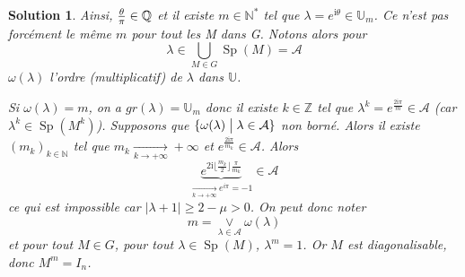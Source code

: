 \documentclass[12pt]{article}
\newtheorem{solution}{Solution}[section]
\theoremstyle{remark}
\newcommand{\N}{\mathbb{N}} \newcommand{\Z}{\mathbb{Z}}
\newcommand{\U}{\mathbb{U}} \newcommand{\E}{\mathbb{E}}
\DeclareMathOperator{\Sp}{Sp} \DeclareMathOperator{\mat}{mat}
\numberwithin{equation}{section}
\begin{document}
\begin{solution}
	Ainsi, $\frac{\theta}{\pi}\in\mathbb{Q}$ et il existe $m\in\N^{*}$ tel que $\lambda=e^{\mathrm{i}\theta}\in\U_{m}$. Ce n'est pas forcément le même $m$ pour tout les M dans G. Notons alors pour 
	$$\lambda\in\bigcup_{M\in G}\Sp(M)=\mathcal{A}$$
	$\omega(\lambda)$ l'ordre (multiplicatif) de $\lambda$ dans $\U$.

	Si $\omega(\lambda)=m$, on a $gr(\lambda)=\U_{m}$ donc il existe $k\in\Z$ tel que $\lambda^{k}=e^{\frac{2\mathrm{i}\pi}{m}}\in\mathcal{A}$ (car $\lambda^{k}\in\Sp(M^{k})$). Supposons que $\{\omega(\lambda)\bigm| \lambda\in\mathcal{A}\}$ non borné. Alors il existe $(m_{k})_{k\in\N}$ tel que $m_{k}\xrightarrow[k\to+\infty]{}+\infty$ et $e^{\frac{2\mathrm{i}\pi}{m_{k}}}\in\mathcal{A}$. Alors 
	$$\underbrace{e^{2\mathrm{i}\lfloor\frac{m_{k}}{2}\rfloor \frac{\pi}{m_{k}}}}_{\xrightarrow[k\to+\infty]{} e^{i\pi}=-1}\in\mathcal{A}$$
	ce qui est impossible car $\vert\lambda+1\vert\geqslant2-\mu>0$. On peut donc noter
	$$m=\underset{\lambda\in\mathcal{A}}{\vee}\omega(\lambda)$$
	et pour tout $M\in G$, pour tout $\lambda\in\Sp(M)$, $\lambda^{m}=1$. Or $M$ est diagonalisable, donc $M^{m}=I_{n}$.
\end{solution}
\end{document}
